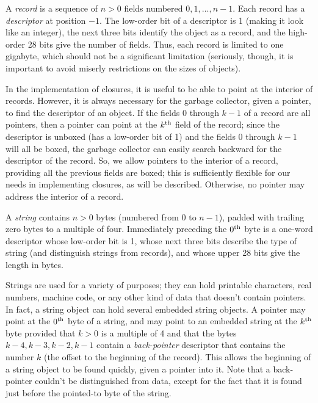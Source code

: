 A {\em record} is a sequence of $n>0$ fields numbered $0,1,...,n-1$.
Each record has a {\em descriptor} at position $-1$.  The low-order bit
of a descriptor is 1
(making it look like an integer), the next three
bits identify the object as a record, and the high-order 28 bits give the
number of fields.  Thus, each record is limited to one gigabyte, which
should not be a significant limitation (seriously, though, it is important
to avoid miserly restrictions on the sizes of objects).

In the implementation of closures, it is useful to be able to point
at the interior of records.  However, it is always necessary for the
garbage collector, given a pointer, to find the descriptor of an object.
If the
fields $0$ through $k-1$ of a record are all pointers, then a pointer
can point at the $k^{\rm th}$ field of the record; since the
descriptor is unboxed (has a low-order bit of 1) and the fields $0$ through
$k-1$ will all be boxed, the garbage collector can easily search backward
for the descriptor of the record.  So, we allow pointers to the interior
of a record, providing all the previous fields are boxed; this is sufficiently
flexible for our needs in implementing closures, as will be described.
Otherwise,
no pointer may address the interior of a record.

A {\em string}
contains $n>0$ bytes (numbered from $0$ to $n-1$),
padded with trailing zero bytes
to a multiple of four.  
Immediately preceding the $0^{\rm th}$ byte is a one-word
descriptor whose low-order bit is 1, whose next three bits describe
the type of string (and distinguish strings from records),
and whose upper 28 bits give the length in bytes.

Strings are used for a variety of purposes;
they can hold printable characters, real numbers, machine code,
or any other kind of data that doesn't contain pointers.  In fact,
a string object can hold several embedded string objects.
A pointer may point at the $0^{\rm th}$ byte of a string, and may point to 
an embedded string at the
$k^{\rm th}$ byte provided that $k>0$ is a multiple of 4 and that the bytes
$k-4, k-3, k-2, k-1$ contain a {\em back-pointer}
descriptor that
contains the number $k$ (the offset to the beginning of the record).
This allows the beginning of a string object
to be found quickly, given a pointer into it.
Note that a back-pointer couldn't be distinguished from data, except
for the fact that it is found just before the pointed-to byte of the
string.


